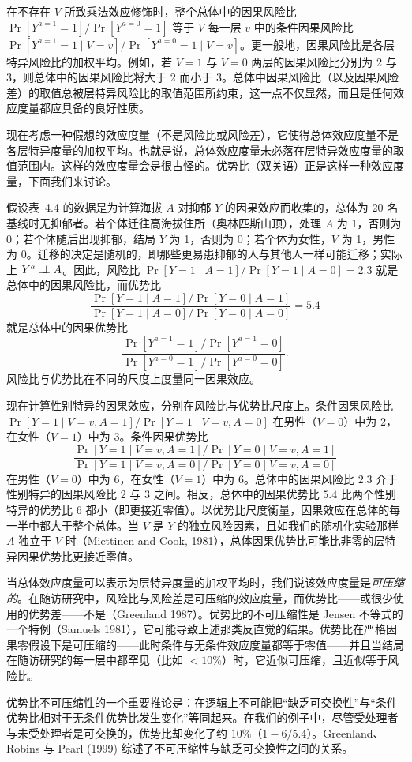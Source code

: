 \begin{finepoint}[可压缩性与优势比]
在不存在 $V$ 所致乘法效应修饰时，整个总体中的因果风险比 $\Pr[Y^{a=1}=1]/\Pr[Y^{a=0}=1]$ 等于 $V$ 每一层 $v$ 中的条件因果风险比 $\Pr[Y^{a=1}=1\mid V=v]/\Pr[Y^{a=0}=1\mid V=v]$。更一般地，因果风险比是各层特异风险比的加权平均。例如，若 $V=1$ 与 $V=0$ 两层的因果风险比分别为 2 与 3，则总体中的因果风险比将大于 2 而小于 3。总体中因果风险比（以及因果风险差）的取值总被层特异风险比的取值范围所约束，这一点不仅显然，而且是任何效应度量都应具备的良好性质。

现在考虑一种假想的效应度量（不是风险比或风险差），它使得总体效应度量不是各层特异度量的加权平均。也就是说，总体效应度量未必落在层特异效应度量的取值范围内。这样的效应度量会是很古怪的。优势比（双关语）正是这样一种效应度量，下面我们来讨论。

假设表~4.4 的数据是为计算海拔 $A$ 对抑郁 $Y$ 的因果效应而收集的，总体为 20 名基线时无抑郁者。若个体迁往高海拔住所（奥林匹斯山顶），处理 $A$ 为 1，否则为 0；若个体随后出现抑郁，结局 $Y$ 为 1，否则为 0；若个体为女性，$V$ 为 1，男性为 0。迁移的决定是随机的，即那些更易患抑郁的人与其他人一样可能迁移；实际上 $Y^a\perp\!\!\!\perp A$。因此，风险比 $\Pr[Y=1\mid A=1]/\Pr[Y=1\mid A=0]=2.3$ 就是总体中的因果风险比，而优势比
\[
\frac{\Pr[Y=1\mid A=1]/\Pr[Y=0\mid A=1]}{\Pr[Y=1\mid A=0]/\Pr[Y=0\mid A=0]}=5.4
\]
就是总体中的因果优势比
\[
\frac{\Pr[Y^{a=1}=1]/\Pr[Y^{a=1}=0]}{\Pr[Y^{a=0}=1]/\Pr[Y^{a=0}=0]}.
\]
风险比与优势比在不同的尺度上度量同一因果效应。

现在计算性别特异的因果效应，分别在风险比与优势比尺度上。条件因果风险比 $\Pr[Y=1\mid V=v,A=1]/\Pr[Y=1\mid V=v,A=0]$ 在男性（$V=0$）中为 2，在女性（$V=1$）中为 3。条件因果优势比
\[
\frac{\Pr[Y=1\mid V=v,A=1]/\Pr[Y=0\mid V=v,A=1]}{\Pr[Y=1\mid V=v,A=0]/\Pr[Y=0\mid V=v,A=0]}
\]
在男性（$V=0$）中为 6，在女性（$V=1$）中为 6。总体中的因果风险比 $2.3$ 介于性别特异的因果风险比 2 与 3 之间。相反，总体中的因果优势比 $5.4$ 比两个性别特异的优势比 6 都小（即更接近零值）。以优势比尺度衡量，因果效应在总体的每一半中都大于整个总体。当 $V$ 是 $Y$ 的独立风险因素，且如我们的随机化实验那样 $A$ 独立于 $V$ 时（Miettinen and Cook, 1981），总体因果优势比可能比非零的层特异因果优势比更接近零值。

当总体效应度量可以表示为层特异度量的加权平均时，我们说该效应度量是\emph{可压缩的}。在随访研究中，风险比与风险差是可压缩的效应度量，而优势比——或很少使用的优势差——不是（Greenland 1987）。优势比的不可压缩性是 Jensen 不等式的一个特例（Samuels 1981），它可能导致上述那类反直觉的结果。优势比在严格因果零假设下是可压缩的——此时条件与无条件效应度量都等于零值——并且当结局在随访研究的每一层中都罕见（比如 $<10\%$）时，它近似可压缩，且近似等于风险比。

优势比不可压缩性的一个重要推论是：在逻辑上不可能把“缺乏可交换性”与“条件优势比相对于无条件优势比发生变化”等同起来。在我们的例子中，尽管受处理者与未受处理者是可交换的，优势比却变化了约 $10\%$（$1-6/5.4$）。Greenland、Robins 与 Pearl (1999) 综述了不可压缩性与缺乏可交换性之间的关系。
\end{finepoint}
